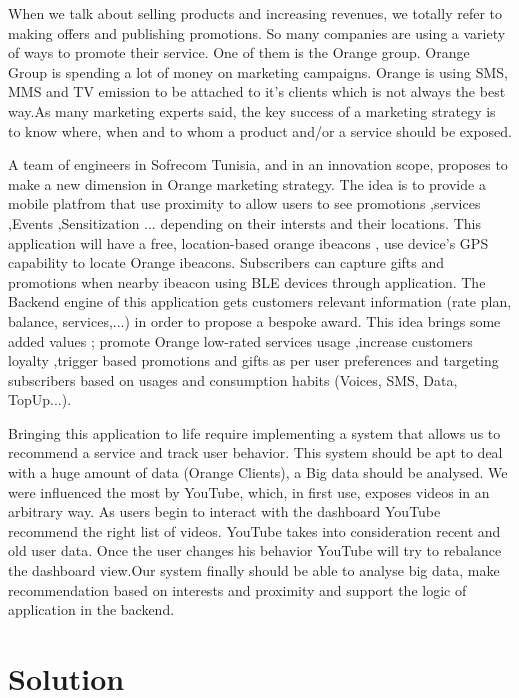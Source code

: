 When we talk about selling products and increasing revenues, we totally refer to making offers and publishing promotions. So many companies 
are using a variety of ways to promote their service. One of them is the Orange group. Orange Group is spending a lot of money on marketing campaigns. 
Orange is using SMS, MMS and TV emission to be attached to it's clients which is not always the best way.As many marketing experts said, the key success of a marketing strategy is to know where,
 when and to whom a product and/or a service should be exposed.

A team of engineers in Sofrecom Tunisia, and in an innovation scope, proposes to make a new dimension in Orange marketing strategy. The idea is to provide
a mobile platfrom that use proximity to allow users to see promotions ,services ,Events ,Sensitization ... depending on their intersts and their locations.
This application will  have a free, location-based orange ibeacons , use device's GPS capability to locate Orange ibeacons.
Subscribers can capture gifts and promotions when nearby ibeacon using BLE devices through application.
The Backend engine of this application gets customers relevant information (rate plan, balance, services,...) in order to propose a bespoke award.
This idea brings some added values ; promote Orange low-rated services usage ,increase customers loyalty ,trigger based promotions and gifts as per 
user preferences and targeting subscribers based on usages and consumption habits (Voices, SMS, Data, TopUp...).

Bringing this application to life require implementing a system that allows us to recommend a service and track user behavior. 
This system should be apt to deal with a huge amount of data (Orange Clients), a Big data should be analysed.
 We were influenced the most by YouTube, which, in first use, exposes videos in an arbitrary way. 
 As users begin to interact with the dashboard YouTube recommend the right list of videos. YouTube takes into consideration recent and old user data. 
 Once the user changes his behavior YouTube will try to rebalance the dashboard view.Our system finally should be able to analyse big data, 
 make recommendation based on interests and proximity and support the logic of application in the backend.

\section{Solution}
\label{subsec:subsec01}

